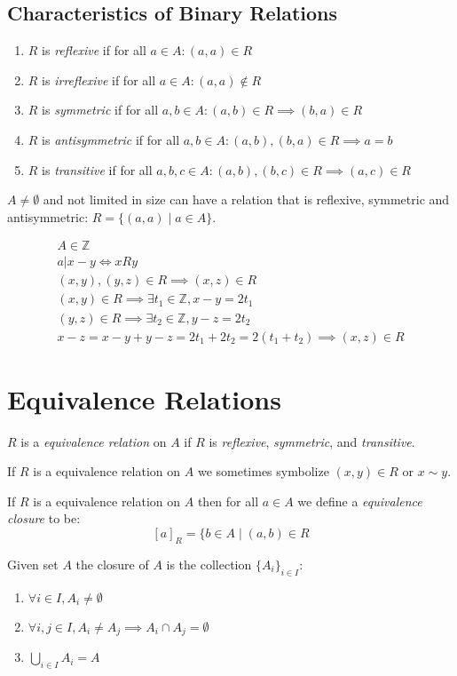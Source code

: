 \documentclass[00_complete]{subfiles}
\begin{document}
\subsection{Characteristics of Binary Relations}
\begin{enumerate}
    \item $R$ is \emph{reflexive} if for all $a \in A: (a,a) \in R$
    \item $R$ is \emph{irreflexive} if for all $a \in A: (a,a) \notin R$
    \item $R$ is \emph{symmetric} if for all $a,b \in A: (a,b) \in R \implies (b,a) \in R$
    \item $R$ is \emph{antisymmetric} if for all $a,b \in A: (a,b), (b,a) \in R \implies
   a=b$
    \item $R$ is \emph{transitive} if for all $a,b,c \in A: (a,b), (b,c) \in R \implies
   (a,c) \in R$
\end{enumerate}
$A \neq \emptyset$ and not limited in size can have a relation that is
reflexive, symmetric and antisymmetric: $R =\{(a,a) \mid a \in A \}$.
\begin{example}
\begin{gather*}
    A \in \mathbb{Z} \\
    a|x-y \iff xRy \\
    (x,y), (y,z) \in R \implies (x,z) \in R \\
    (x,y) \in R \implies \exists t_1 \in \mathbb{Z}, x-y=2t_1 \\
    (y,z) \in R \implies \exists t_2 \in \mathbb{Z}, y-z=2t_2 \\
    x-z = x-y + y-z = 2t_1 + 2t_2 = 2(t_1 + t_2) \implies (x,z) \in R
\end{gather*}
\end{example}
\section{Equivalence Relations}
\begin{definition}
$R$ is a \emph{equivalence relation} on $A$ if $R$ is \emph{reflexive}, \emph{symmetric}, and
\emph{transitive}.
\end{definition}

\begin{symbols}
If $R$ is a equivalence relation on $A$ we sometimes symbolize $(x,y) \in R$ or
$x \sim y$.
\end{symbols}

\begin{definition}
If $R$ is a equivalence relation on $A$ then for all $a \in A$ we define a
\emph{equivalence closure} to be:
$$[a]_R = \{b \in A \mid (a,b) \in R$$

Given set $A$ the closure of $A$ is the collection $\{A_i\}_{i \in I}$:
\begin{enumerate}
    \item $\forall i \in I, A_i \neq \emptyset$
    \item $\forall i,j \in I, A_i \neq A_j \implies A_i \cap A_j = \emptyset$
    \item $\displaystyle \bigcup_{i \in I}A_i=A$
\end{enumerate}
\end{definition}
\end{document}
